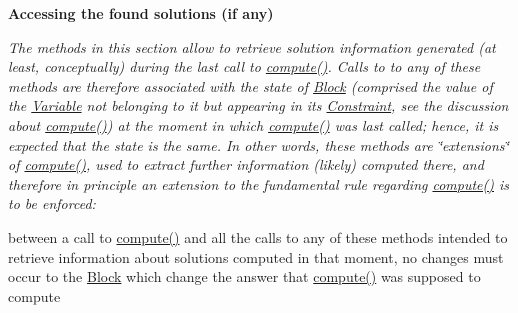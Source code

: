 \begin{Indent}\textbf{ Accessing the found solutions (if any)}\par
{\em The methods in this section allow to retrieve solution information generated (at least, conceptually) during the last call to \mbox{\hyperlink{class_s_m_spp__di__unipi__it_1_1_solver_a504d4e3e174c7a518cc66156a8a45ce5}{compute()}}. Calls to to any of these methods are therefore associated with the state of \mbox{\hyperlink{class_s_m_spp__di__unipi__it_1_1_block}{Block}} (comprised the value of the \mbox{\hyperlink{class_s_m_spp__di__unipi__it_1_1_variable}{Variable}} not belonging to it but appearing in its \mbox{\hyperlink{class_s_m_spp__di__unipi__it_1_1_constraint}{Constraint}}, see the discussion about \mbox{\hyperlink{class_s_m_spp__di__unipi__it_1_1_solver_a504d4e3e174c7a518cc66156a8a45ce5}{compute()}}) at the moment in which \mbox{\hyperlink{class_s_m_spp__di__unipi__it_1_1_solver_a504d4e3e174c7a518cc66156a8a45ce5}{compute()}} was last called; hence, it is expected that the state is the same. In other words, these methods are \char`\"{}extensions\char`\"{} of \mbox{\hyperlink{class_s_m_spp__di__unipi__it_1_1_solver_a504d4e3e174c7a518cc66156a8a45ce5}{compute()}}, used to extract further information (likely) computed there, and therefore in principle an extension to the fundamental rule regarding \mbox{\hyperlink{class_s_m_spp__di__unipi__it_1_1_solver_a504d4e3e174c7a518cc66156a8a45ce5}{compute()}} is to be enforced\+:

between a call to \mbox{\hyperlink{class_s_m_spp__di__unipi__it_1_1_solver_a504d4e3e174c7a518cc66156a8a45ce5}{compute()}} and all the calls to any of these methods intended to retrieve information about solutions computed in that moment, no changes must occur to the \mbox{\hyperlink{class_s_m_spp__di__unipi__it_1_1_block}{Block}} which change the answer that \mbox{\hyperlink{class_s_m_spp__di__unipi__it_1_1_solver_a504d4e3e174c7a518cc66156a8a45ce5}{compute()}} was supposed to compute

}
\end{Indent}
